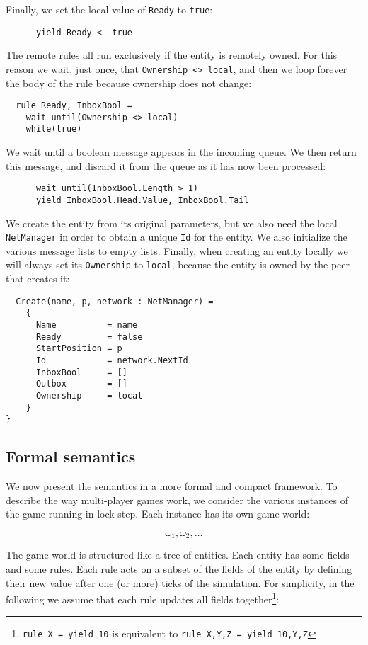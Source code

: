 Finally, we set the local value of \texttt{Ready} to \texttt{true}:

\begin{lstlisting}
      yield Ready <- true
\end{lstlisting}

The remote rules all run exclusively if the entity is remotely owned. For this reason we wait, just once, that \texttt{Ownership <> local}, and then we loop forever the body of the rule because ownership does not change:

\begin{lstlisting}
  rule Ready, InboxBool = 
    wait_until(Ownership <> local)
    while(true)
\end{lstlisting}

We wait until a boolean message appears in the incoming queue. We then return this message, and discard it from the queue as it has now been processed:

\begin{lstlisting}
      wait_until(InboxBool.Length > 1)
      yield InboxBool.Head.Value, InboxBool.Tail
\end{lstlisting}

We create the entity from its original parameters, but we also need the local \texttt{NetManager} in order to obtain a unique \texttt{Id} for the entity. We also initialize the various message lists to empty lists. Finally, when creating an entity locally we will always set its \texttt{Ownership} to \texttt{local}, because the entity is owned by the peer that creates it:

\begin{lstlisting}
  Create(name, p, network : NetManager) = 
    {
      Name          = name
      Ready         = false
      StartPosition = p
      Id            = network.NextId
      InboxBool     = []
      Outbox        = []
      Ownership     = local
    }
}
\end{lstlisting}


\subsection{Formal semantics}
We now present the semantics in a more formal and compact framework. To describe the way multi-player games work, we consider the various instances of the game running in lock-step. Each instance has its own game world:

$$\omega_1, \omega_2, \dots$$

The game world is structured like a tree of entities. Each entity has some fields and some rules. Each rule acts on a subset of the fields of the entity by defining their new value after one (or more) ticks of the simulation. For simplicity, in the following we assume that each rule updates all fields together\footnote{\texttt{rule X = yield 10} is equivalent to \texttt{rule X,Y,Z = yield 10,Y,Z}}:

